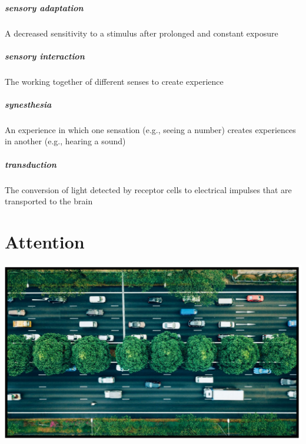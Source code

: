 \documentclass[
]{krantz}
\begin{document}
\hypertarget{sensory-adaptation}{%
\paragraph*{sensory adaptation}\label{sensory-adaptation}}

A decreased sensitivity to a stimulus after prolonged and constant exposure

\hypertarget{sensory-interaction}{%
\paragraph*{sensory interaction}\label{sensory-interaction}}

The working together of different senses to create experience

\hypertarget{synesthesia}{%
\paragraph*{synesthesia}\label{synesthesia}}

An experience in which one sensation (e.g., seeing a number) creates experiences in another (e.g., hearing a sound)

\hypertarget{transduction}{%
\paragraph*{transduction}\label{transduction}}

The conversion of light detected by receptor cells to electrical impulses that are transported to the brain

\hypertarget{attention}{%
\chapter{Attention}\label{attention}}

\begin{center}\includegraphics[width=1\linewidth]{images/ch3/fig0} \end{center}
\end{document}
